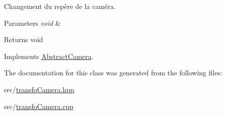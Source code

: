 Changement du repère de la caméra. 


\begin{DoxyParams}{Parameters}
{\em void} & \\
\hline
\end{DoxyParams}
\begin{DoxyReturn}{Returns}
void 
\end{DoxyReturn}


Implements \hyperlink{class_abstract_camera_a4bfcc6ed8980d64cf1d43d7dcb60129b}{Abstract\+Camera}.



The documentation for this class was generated from the following files\+:\begin{DoxyCompactItemize}
\item 
src/\hyperlink{transfo_camera_8hpp}{transfo\+Camera.\+hpp}\item 
src/\hyperlink{transfo_camera_8cpp}{transfo\+Camera.\+cpp}\end{DoxyCompactItemize}
